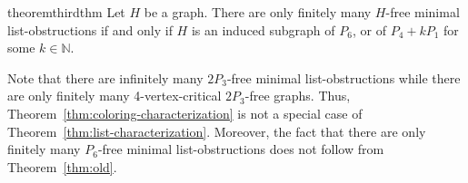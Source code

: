 \documentclass[11pt]{article}
\newcommand{\jg}[1] {
	{\color{blue}{{\tt [JG: }{#1}\tt]}}
}
\begin{document}
\begin{restatable}{theorem}{thirdthm}\label{thm:list-characterization}
Let $H$ be a graph. There are only finitely many $H$-free minimal list-obstructions if and only if $H$ is an induced subgraph of $P_6$, or of $P_4 + kP_1$ for some $k \in \mathbb N$.
\end{restatable}


Note that there are infinitely many $2P_3$-free minimal list-obstructions while there are only finitely many 4-vertex-critical $2P_3$-free graphs.
Thus, Theorem~\ref{thm:coloring-characterization} is not a special case of Theorem~\ref{thm:list-characterization}.
Moreover, the fact that there are only finitely many $P_6$-free minimal list-obstructions does not follow from Theorem~\ref{thm:old}.

\end{document}

